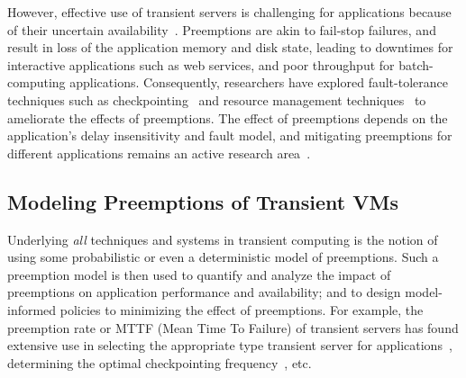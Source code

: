 
However, effective use of transient servers is challenging for applications because of their uncertain availability~\cite{transient}. 
Preemptions are akin to fail-stop failures, and result in loss of the application memory and disk state, leading to downtimes for interactive applications such as web services, and poor throughput for batch-computing applications. 
Consequently, researchers have explored fault-tolerance techniques such as checkpointing~\cite{flint, marathe2014exploiting, spoton} and resource management techniques~\cite{exosphere} to ameliorate the effects of preemptions. %
The effect of preemptions depends on the application's delay insensitivity and fault model, and mitigating preemptions for different applications remains an active research area~\cite{hourglass-eurosys19}. 




\vspace*{\subsecspace}
\subsection{Modeling Preemptions of Transient VMs}


Underlying \emph{all} techniques and systems in transient computing is the notion of using some probabilistic or even a deterministic model of  preemptions. 
%
Such a preemption model is then used to quantify and analyze the impact of preemptions on application performance and availability; and to design model-informed policies to minimizing the effect of preemptions. 
%
For example, the preemption rate or MTTF (Mean Time To Failure) of transient servers has found extensive use in selecting the appropriate type transient server for applications~\cite{exosphere, spoton}, determining the optimal checkpointing frequency~\cite{flint, marathe2014exploiting, proteus-eur17, ghit-spark-hpdc}, etc. 


